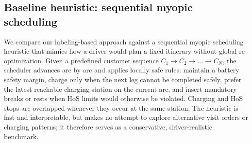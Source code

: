 \documentclass[3p,11pt,authoryear]{elsarticle}  %
\begin{document}

    


\subsection{Baseline heuristic: sequential myopic scheduling}
\label{sec:baseline_heuristic}

We compare our labeling-based approach against a sequential myopic scheduling heuristic that mimics how a driver would plan a fixed itinerary without global re-optimization. Given a predefined customer sequence $C_1 \rightarrow C_2 \rightarrow \dots \rightarrow C_N$, the scheduler advances arc by arc and applies locally safe rules: maintain a battery safety margin, charge only when the next leg cannot be completed safely, prefer the latest reachable charging station on the current arc, and insert mandatory breaks or rests when HoS limits would otherwise be violated. Charging and HoS stops are overlapped whenever they occur at the same station. The heuristic is fast and interpretable, but makes no attempt to explore alternative visit orders or charging patterns; it therefore serves as a conservative, driver-realistic benchmark.
\end{document}
